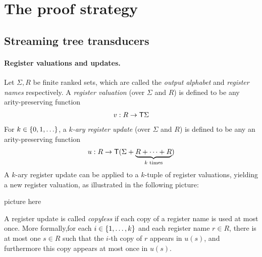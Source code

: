 \section{The proof strategy}

\subsection{Streaming tree transducers}





\paragraph*{Register valuations and updates.}   Let $\Sigma, R$ be finite ranked sets, which are called the \emph{output alphabet} and \emph{register names} respectively.  
A \emph{register valuation} (over $\Sigma$ and $R$) is defined to be any arity-preserving function
\begin{align*}
    v : R \to \mathsf T \Sigma
\end{align*}
For  $k \in \{0,1,\ldots\}$, a \emph{$k$-ary register update} (over $\Sigma$ and $R$) is defined to be any an arity-preserving function
\begin{align*}
    u : R \to \mathsf T ( \Sigma + \underbrace{R + \cdots +R}_{\text{$k$ times}})
\end{align*}
A $k$-ary register update can be applied to a $k$-tuple of register valuations, yielding a new register valuation, as illustrated in the following picture:
\begin{center}
    picture here
\end{center}
A register update is called \emph{copyless} if each copy of a register name is used at most once. More formally,for each $i \in \{1,\ldots,k\}$ and each register name $r \in R$, there is at most one $s \in R$ such that the $i$-th copy of $r$ appears in $u(s)$, and furthermore this copy appears at most once in $u(s)$. 


